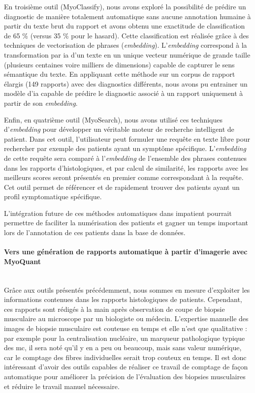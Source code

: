 En troisième outil (MyoClassify), nous avons exploré la possibilité de prédire un diagnostic de manière totalement automatique sans aucune annotation humaine à partir du texte brut du rapport et avons obtenu une exactitude de classification de 65 \% (versus 35 \% pour le hasard). Cette classification est réalisée grâce à des techniques de vectorisation de phrases (\textit{embedding}). L’\textit{embedding} correspond à la transformation par \gls{ia} d’un texte en un unique vecteur numérique de grande taille (plusieurs centaines voire milliers de dimensions) capable de capturer le sens sémantique du texte. En appliquant cette méthode sur un corpus de rapport élargis (149 rapports) avec des diagnostics différents, nous avons pu entrainer un modèle d’\gls{ia} capable de prédire le diagnostic associé à un rapport uniquement à partir de son \textit{embedding}.

Enfin, en quatrième outil (MyoSearch), nous avons utilisé ces techniques d’\textit{embedding} pour développer un véritable moteur de recherche intelligent de patient. Dans cet outil, l’utilisateur peut formuler une requête en texte libre pour rechercher par exemple des patients ayant un symptôme spécifique. L’\textit{embedding} de cette requête sera comparé à l’\textit{embedding} de l’ensemble des phrases contenues dans les rapports d’histologiques, et par calcul de similarité, les rapports avec les meilleurs scores seront présentés en premier comme correspondant à la requête. Cet outil permet de référencer et de rapidement trouver des patients ayant un profil symptomatique spécifique.

L’intégration future de ces méthodes automatiques dans \gls{impatient} pourrait permettre de faciliter la numérisation des patients et gagner un temps important lors de l’annotation de ces patients dans la base de données.


\paragraph{\textbf{Vers une génération de rapports automatique à partir d’imagerie avec MyoQuant}}\mbox{}\\

Grâce aux outils présentés précédemment, nous sommes en mesure d’exploiter les informations contenues dans les rapports histologiques de patients. Cependant, ces rapports sont rédigés à la main après observation de coupe de biopsie musculaire au microscope par un biologiste ou médecin. L’expertise manuelle des images de biopsie musculaire est couteuse en temps et elle n’est que qualitative : par exemple pour la centralisation nucléaire, un marqueur pathologique typique des \gls{mc}, il sera noté qu’il y en a peu ou beaucoup, mais sans valeur numérique, car le comptage des fibres individuelles serait trop couteux en temps. Il est donc intéressant d’avoir des outils capables de réaliser ce travail de comptage de façon automatique pour améliorer la précision de l’évaluation des biopsies musculaires et réduire le travail manuel nécessaire.

